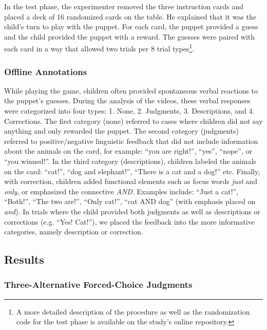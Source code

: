 \documentclass[,man,floatsintext]{apa6}
\let\rmarkdownfootnote\footnote%
\def\footnote{\protect\rmarkdownfootnote}
\begin{document}
In the test phase, the experimenter removed the three instruction cards and placed a deck of 16 randomized cards on the table. He explained that it was the child's turn to play with the puppet. For each card, the puppet provided a guess and the child provided the puppet with a reward. The guesses were paired with each card in a way that allowed two trials per 8 trial types\footnote{A more detailed description of the procedure as well as the randomization code for the test phase is available on the study's online repository.}.

\hypertarget{feedbackCoding}{%
\subsubsection{Offline Annotations}\label{feedbackCoding}}

While playing the game, children often provided spontaneous verbal reactions to the puppet's guesses. During the analysis of the videos, these verbal responses were categorized into four types: 1. None, 2. Judgments, 3. Descriptions, and 4. Corrections. The first category (none) referred to cases where children did not say anything and only rewarded the puppet. The second category (judgments) referred to positive/negative linguistic feedback that did not include information about the animals on the card, for example: \enquote{you are right!}, \enquote{yes}, \enquote{nope}, or \enquote{you winned!}. In the third category (descriptions), children labeled the animals on the card: \enquote{cat!}, \enquote{dog and elephant!}, \enquote{There is a cat and a dog!} etc. Finally, with correction, children added functional elements such as focus words \emph{just} and \emph{only}, or emphasized the connective \emph{AND}. Examples include: \enquote{Just a cat!}, \enquote{Both!}, \enquote{The two are!}, \enquote{Only cat!}, \enquote{cat AND dog} (with emphasis placed on \emph{and}). In trials where the child provided both judgments as well as descriptions or corrections (e.g. \enquote{Yes! Cat!}), we placed the feedback into the more informative categories, namely description or correction.

\hypertarget{results-1}{%
\subsection{Results}\label{results-1}}

\hypertarget{three-alternative-forced-choice-judgments}{%
\subsubsection{Three-Alternative Forced-Choice Judgments}\label{three-alternative-forced-choice-judgments}}
\end{document}

